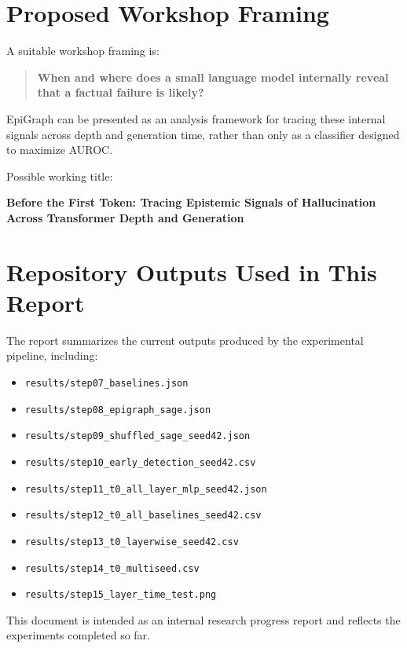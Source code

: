 \documentclass[11pt]{article}
\begin{document}
\section{Proposed Workshop Framing}

A suitable workshop framing is:

\begin{quote}
\textbf{When and where does a small language model internally reveal that a factual failure is likely?}
\end{quote}

EpiGraph can be presented as an analysis framework for tracing these internal signals across depth and generation time, rather than only as a classifier designed to maximize AUROC.

Possible working title:

\begin{center}
\textbf{Before the First Token: Tracing Epistemic Signals of Hallucination Across Transformer Depth and Generation}
\end{center}

\section{Repository Outputs Used in This Report}

The report summarizes the current outputs produced by the experimental pipeline, including:

\begin{itemize}[leftmargin=1.5em]
    \item \texttt{results/step07\_baselines.json}
    \item \texttt{results/step08\_epigraph\_sage.json}
    \item \texttt{results/step09\_shuffled\_sage\_seed42.json}
    \item \texttt{results/step10\_early\_detection\_seed42.csv}
    \item \texttt{results/step11\_t0\_all\_layer\_mlp\_seed42.json}
    \item \texttt{results/step12\_t0\_all\_baselines\_seed42.csv}
    \item \texttt{results/step13\_t0\_layerwise\_seed42.csv}
    \item \texttt{results/step14\_t0\_multiseed.csv}
    \item \texttt{results/step15\_layer\_time\_test.png}
\end{itemize}

\vfill
\begin{center}
\small
This document is intended as an internal research progress report and reflects the experiments completed so far.
\end{center}
\end{document}
